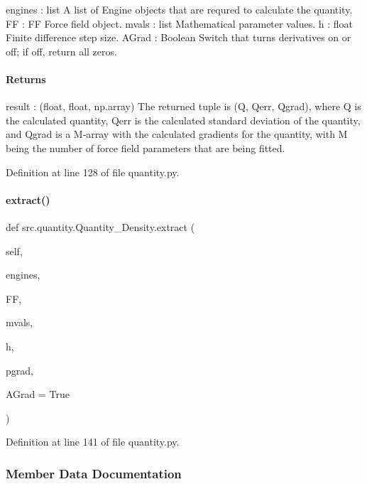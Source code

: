 engines \+: list A list of Engine objects that are requred to calculate the quantity. FF \+: FF Force field object. mvals \+: list Mathematical parameter values. h \+: float Finite difference step size. A\+Grad \+: Boolean Switch that turns derivatives on or off; if off, return all zeros.

\paragraph*{Returns }

result \+: (float, float, np.\+array) The returned tuple is (Q, Qerr, Qgrad), where Q is the calculated quantity, Qerr is the calculated standard deviation of the quantity, and Qgrad is a M-\/array with the calculated gradients for the quantity, with M being the number of force field parameters that are being fitted. 

Definition at line 128 of file quantity.\+py.

\mbox{\label{classsrc_1_1quantity_1_1Quantity__Density_aca32f2422b4082a57fbd5030d66dec6c}} 
\paragraph{\texorpdfstring{extract()}{extract()}\hspace{0.1cm}{\footnotesize\ttfamily [2/2]}}
{\footnotesize\ttfamily def src.\+quantity.\+Quantity\+\_\+\+Density.\+extract (\begin{DoxyParamCaption}\item[{}]{self,  }\item[{}]{engines,  }\item[{}]{FF,  }\item[{}]{mvals,  }\item[{}]{h,  }\item[{}]{pgrad,  }\item[{}]{A\+Grad = {\ttfamily True} }\end{DoxyParamCaption})}



Definition at line 141 of file quantity.\+py.



\subsubsection{Member Data Documentation}
\mbox{\label{classsrc_1_1quantity_1_1Quantity__Density_a0b13b8f280f43796654c62a9717799ad}} 

